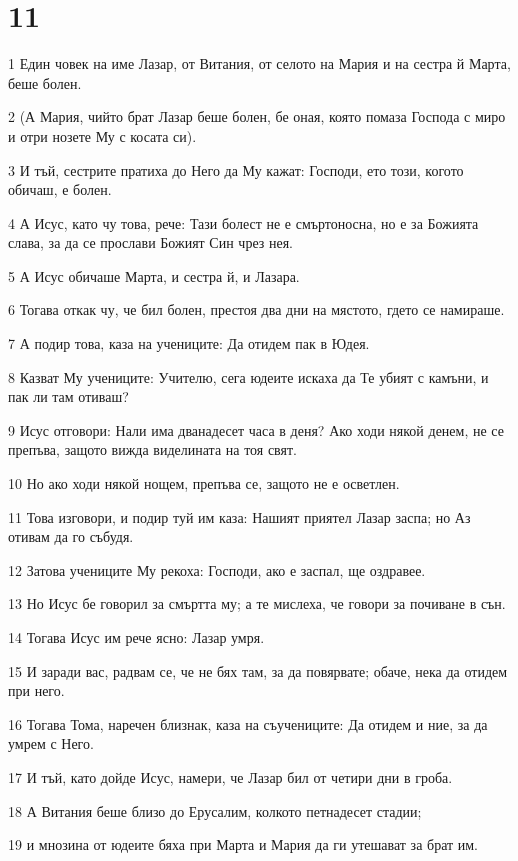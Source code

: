 \chapter{11}

\par 1 Един човек на име Лазар, от Витания, от селото на Мария и на сестра й Марта, беше болен.
\par 2 (А Мария, чийто брат Лазар беше болен, бе оная, която помаза Господа с миро и отри нозете Му с косата си).
\par 3 И тъй, сестрите пратиха до Него да Му кажат: Господи, ето този, когото обичаш, е болен.
\par 4 А Исус, като чу това, рече: Тази болест не е смъртоносна, но е за Божията слава, за да се прослави Божият Син чрез нея.
\par 5 А Исус обичаше Марта, и сестра й, и Лазара.
\par 6 Тогава откак чу, че бил болен, престоя два дни на мястото, гдето се намираше.
\par 7 А подир това, каза на учениците: Да отидем пак в Юдея.
\par 8 Казват Му учениците: Учителю, сега юдеите искаха да Те убият с камъни, и пак ли там отиваш?
\par 9 Исус отговори: Нали има дванадесет часа в деня? Ако ходи някой денем, не се препъва, защото вижда виделината на тоя свят.
\par 10 Но ако ходи някой нощем, препъва се, защото не е осветлен.
\par 11 Това изговори, и подир туй им каза: Нашият приятел Лазар заспа; но Аз отивам да го събудя.
\par 12 Затова учениците Му рекоха: Господи, ако е заспал, ще оздравее.
\par 13 Но Исус бе говорил за смъртта му; а те мислеха, че говори за почиване в сън.
\par 14 Тогава Исус им рече ясно: Лазар умря.
\par 15 И заради вас, радвам се, че не бях там, за да повярвате; обаче, нека да отидем при него.
\par 16 Тогава Тома, наречен близнак, каза на съучениците: Да отидем и ние, за да умрем с Него.
\par 17 И тъй, като дойде Исус, намери, че Лазар бил от четири дни в гроба.
\par 18 А Витания беше близо до Ерусалим, колкото петнадесет стадии;
\par 19 и мнозина от юдеите бяха при Марта и Мария да ги утешават за брат им.
